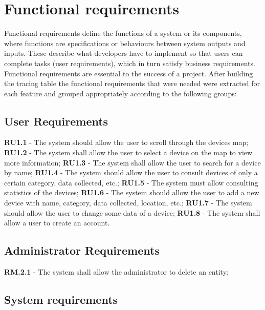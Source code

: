 \documentclass{scrreprt}
\begin{document}
\section{Functional requirements}

Functional requirements define the functions of a system or its components,
where functions are specifications or behaviours between system outputs and
inputs. \cite{fulton2017chapter} These describe what developers have to implement
so that users can complete tasks (user requirements), which in turn satisfy
business requirements. \cite{wiegers2013software} Functional requirements are
essential to the success of a project.
After building the tracing table the functional requirements that were needed
were extracted for each feature and grouped appropriately according to the
following groups:

\subsection{User Requirements}

\textbf{RU1.1} - The system should allow the user to scroll through the devices map;
\newline
\textbf{RU1.2} - The system shall allow the user to select a device on the map to view more information;
\newline
\textbf{RU1.3} - The system shall allow the user to search for a device by name;
\newline
\textbf{RU1.4} - The system should allow the user to consult devices of only a certain category, data collected, etc.;
\newline
\textbf{RU1.5} - The system must allow consulting statistics of the devices;
\newline
\textbf{RU1.6} - The system should allow the user to add a new device with name, category, data collected, location, etc.;
\newline
\textbf{RU1.7} - The system should allow the user to change some data of a device;
\newline
\textbf{RU1.8} - The system shall allow a user to create an account.

\subsection{Administrator Requirements}

\textbf{RM.2.1} - The system shall allow the administrator to delete an entity;

\subsection{System requirements}
\end{document}
